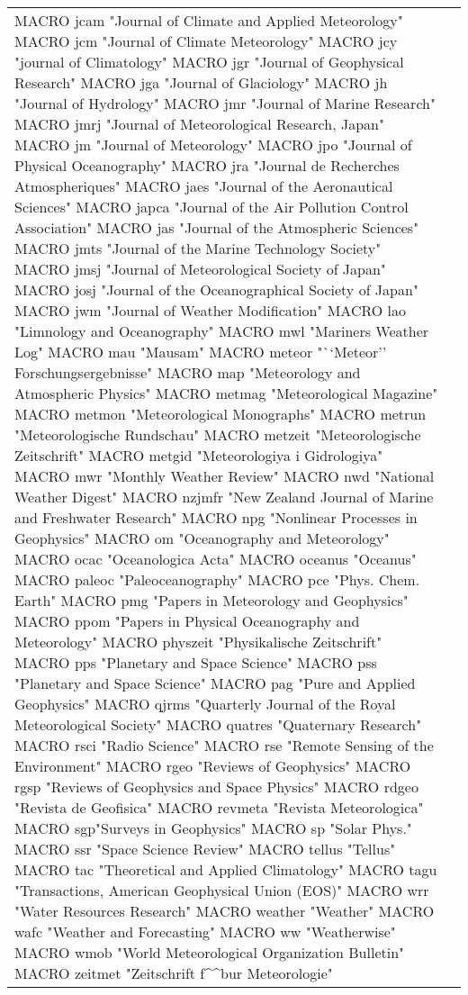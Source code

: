 \documentclass{article}
\begin{document}
\begin{longtable}{lp{6cm}}
MACRO {jcam} {"Journal of Climate and Applied Meteorology"}
MACRO {jcm} {"Journal of Climate Meteorology"}
MACRO {jcy} {"journal of Climatology"}
MACRO {jgr} {"Journal of Geophysical Research"}
MACRO {jga} {"Journal of Glaciology"}
MACRO {jh} {"Journal of Hydrology"}
MACRO {jmr} {"Journal of Marine Research"}
MACRO {jmrj} {"Journal of Meteorological Research, Japan"}
MACRO {jm} {"Journal of Meteorology"}
MACRO {jpo} {"Journal of Physical Oceanography"}
MACRO {jra} {"Journal de Recherches Atmospheriques"}
MACRO {jaes} {"Journal of the Aeronautical Sciences"}
MACRO {japca} {"Journal of the Air Pollution Control Association"}
MACRO {jas} {"Journal of the Atmospheric Sciences"}
MACRO {jmts} {"Journal of the Marine Technology Society"}
MACRO {jmsj} {"Journal of Meteorological Society of Japan"}
MACRO {josj} {"Journal of the Oceanographical Society of Japan"}
MACRO {jwm} {"Journal of Weather Modification"}
MACRO {lao} {"Limnology and Oceanography"}
MACRO {mwl} {"Mariners Weather Log"}
MACRO {mau} {"Mausam"}
MACRO {meteor} {"``Meteor'' Forschungsergebnisse"}
MACRO {map} {"Meteorology and Atmospheric Physics"}
MACRO {metmag} {"Meteorological Magazine"}
MACRO {metmon} {"Meteorological Monographs"}
MACRO {metrun} {"Meteorologische Rundschau"}
MACRO {metzeit} {"Meteorologische Zeitschrift"}
MACRO {metgid} {"Meteorologiya i Gidrologiya"}
MACRO {mwr} {"Monthly Weather Review"}
MACRO {nwd} {"National Weather Digest"}
MACRO {nzjmfr} {"New Zealand Journal of Marine and Freshwater Research"}
MACRO {npg} {"Nonlinear Processes in Geophysics"}
MACRO {om} {"Oceanography and Meteorology"}
MACRO {ocac} {"Oceanologica Acta"}
MACRO {oceanus} {"Oceanus"}
MACRO {paleoc} {"Paleoceanography"}
MACRO {pce} {"Phys. Chem. Earth"}
MACRO {pmg} {"Papers in Meteorology and Geophysics"}
MACRO {ppom} {"Papers in Physical Oceanography and Meteorology"}
MACRO {physzeit} {"Physikalische Zeitschrift"}
MACRO {pps} {"Planetary and Space Science"}
MACRO {pss} {"Planetary and Space Science"}
MACRO {pag} {"Pure and Applied Geophysics"}
MACRO {qjrms} {"Quarterly Journal of the Royal Meteorological Society"}
MACRO {quatres} {"Quaternary Research"}
MACRO {rsci} {"Radio Science"}
MACRO {rse} {"Remote Sensing of the Environment"}
MACRO {rgeo} {"Reviews of Geophysics"}
MACRO {rgsp} {"Reviews of Geophysics and Space Physics"}
MACRO {rdgeo} {"Revista de Geofisica"}
MACRO {revmeta} {"Revista Meteorologica"}
MACRO {sgp}{"Surveys in Geophysics"}
MACRO {sp} {"Solar Phys."}
MACRO {ssr} {"Space Science Review"}
MACRO {tellus} {"Tellus"}
MACRO {tac} {"Theoretical and Applied Climatology"}
MACRO {tagu} {"Transactions, American Geophysical Union (EOS)"}
MACRO {wrr} {"Water Resources Research"}
MACRO {weather} {"Weather"}
MACRO {wafc} {"Weather and Forecasting"}
MACRO {ww} {"Weatherwise"}
MACRO {wmob} {"World Meteorological Organization Bulletin"}
MACRO {zeitmet} {"Zeitschrift f\^^b{u}r Meteorologie"}
\end{longtable}
\endgroup
\end{document}
